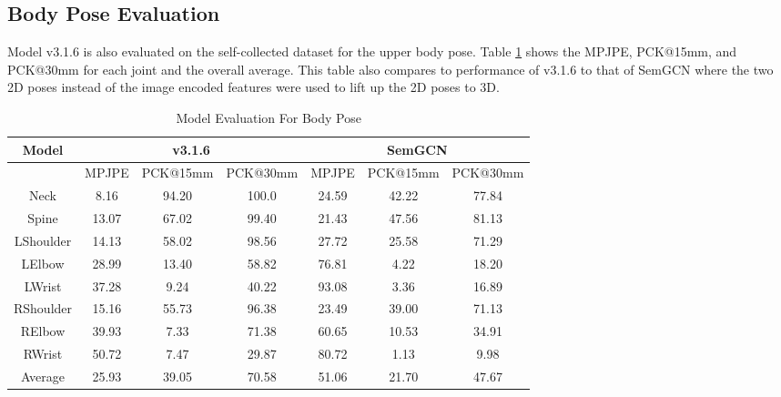 \subsection{Body Pose Evaluation}
\noindent
Model v3.1.6 is also evaluated on the self-collected dataset for the upper body pose. Table \ref{table:model_evaluation_body_pose} shows the MPJPE, PCK@15mm, and PCK@30mm for each joint and the overall average. This table also compares to performance of v3.1.6 to that of SemGCN where the two 2D poses instead of the image encoded features were used to lift up the 2D poses to 3D.
\begin{table}[ht]
\centering
\begin{tabular*}{\textwidth}{c @{\extracolsep{\fill}} cccccc}
\toprule
Model &  \multicolumn{3}{c}{v3.1.6} & \multicolumn{3}{c}{SemGCN} \\[0.5ex] 
\midrule
{} & MPJPE & PCK@15mm & PCK@30mm & MPJPE & PCK@15mm & PCK@30mm \\ 
\hline
Neck & 8.16 & 94.20 & 100.0 & 24.59 & 42.22 & 77.84 \\ 
Spine & 13.07 & 67.02 & 99.40 & 21.43 & 47.56 & 81.13 \\
LShoulder & 14.13 & 58.02 & 98.56 & 27.72 & 25.58 & 71.29 \\
LElbow & 28.99 & 13.40 & 58.82 & 76.81 & 4.22 & 18.20 \\
LWrist & 37.28 & 9.24 & 40.22 & 93.08 & 3.36 & 16.89 \\ 
RShoulder & 15.16 & 55.73 & 96.38 & 23.49 & 39.00 & 71.13 \\
RElbow & 39.93 & 7.33 & 71.38 & 60.65 & 10.53 & 34.91 \\
RWrist & 50.72 & 7.47 & 29.87 & 80.72 & 1.13 & 9.98 \\
Average & 25.93 & 39.05 & 70.58 & 51.06 & 21.70 & 47.67 \\
[1ex] 
\hline
\end{tabular*}
\caption{Model Evaluation For Body Pose}
\label{table:model_evaluation_body_pose}
\end{table}

